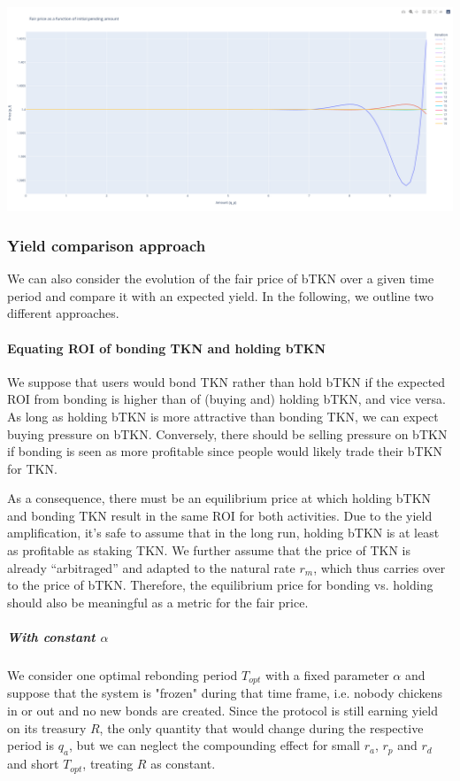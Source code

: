 \documentclass{article}
\begin{document}
\includegraphics[width=\linewidth]{./ChickenBonds_Whitepaper_recursive_price_2.png}

\subsubsection{Yield comparison approach}
We can also consider the evolution of the fair price of bTKN over a given time period and compare it with an expected yield. In the following, we outline two different approaches.

\paragraph{Equating ROI of bonding TKN and holding bTKN}
We suppose that users would bond TKN rather than hold bTKN if the expected ROI from bonding is higher than of (buying and) holding bTKN, and vice versa. As long as holding bTKN is more attractive than bonding TKN, we can expect buying pressure on bTKN. Conversely, there should be selling pressure on bTKN if bonding is seen as more profitable since people would likely trade their bTKN for TKN. 

As a consequence, there must be an equilibrium price at which holding bTKN and bonding TKN result in the same ROI for both activities. Due to the yield amplification, it's safe to assume that in the long run, holding bTKN is at least as profitable as staking TKN. We further assume that the price of TKN is already “arbitraged” and adapted to the natural rate $r_m$, which thus carries over to the price of bTKN. Therefore, the equilibrium price for bonding vs. holding should also be meaningful as a metric for the fair price.

\subparagraph{With constant $\alpha$}
We consider one optimal rebonding period $T_{opt}$ with a fixed parameter $\alpha$ and suppose that the system is "frozen" during that time frame, i.e. nobody chickens in or out and no new bonds are created. Since the protocol is still earning yield on its treasury $R$, the only quantity that would change during the respective period is $q_a$, but we can neglect the compounding effect for small $r_a$, $r_p$ and $r_d$ and short $T_{opt}$, treating $R$ as constant.
\end{document}
